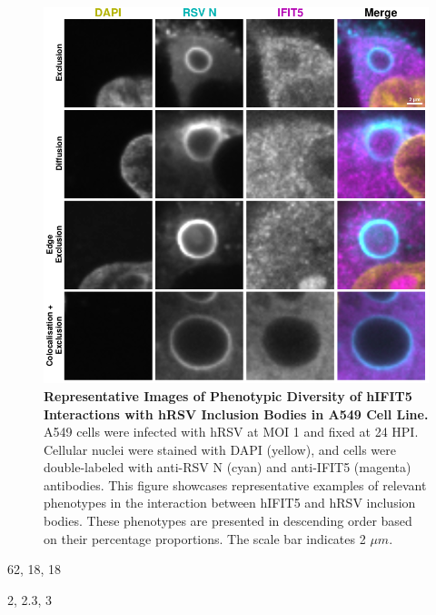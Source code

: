 \begin{figure}
    \centering
    \includegraphics[width=1\linewidth]{08. Chapter 3/Figs/02. Infection/04. IFIT5/03. a549 i5.pdf}
    \caption[Representative Images of Phenotypic Diversity of hIFIT5 Interactions with hRSV Inclusion Bodies in A549 Cell Line.]{\textbf{Representative Images of Phenotypic Diversity of hIFIT5 Interactions with hRSV Inclusion Bodies in A549 Cell Line.} A549 cells were infected with hRSV at MOI 1 and fixed at 24 HPI. Cellular nuclei were stained with DAPI (yellow), and cells were double-labeled with anti-RSV N (cyan) and anti-IFIT5 (magenta) antibodies. This figure showcases representative examples of relevant phenotypes in the interaction between hIFIT5 and hRSV inclusion bodies. These phenotypes are presented in descending order based on their percentage proportions. The scale bar indicates 2 \(\mu m\).}
    \label{fig:Representative Images of Phenotypic Diversity of hIFIT5 Interactions with hRSV Inclusion Bodies in A549 Cell Line}
\end{figure}

62, 18, 18

2, 2.3, 3

